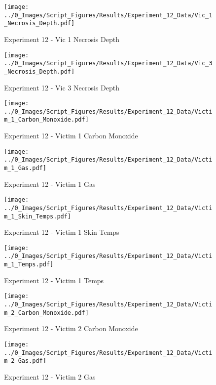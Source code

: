 	\clearpage

	\begin{figure}[H]
		\centering
		\texttt{[image: ../0\_Images/Script\_Figures/Results/Experiment\_12\_Data/Vic\_1\_Necrosis\_Depth.pdf]}
		\caption[]{Experiment 12 - Vic 1 Necrosis Depth}
	\end{figure}
 

	\begin{figure}[H]
		\centering
		\texttt{[image: ../0\_Images/Script\_Figures/Results/Experiment\_12\_Data/Vic\_3\_Necrosis\_Depth.pdf]}
		\caption[]{Experiment 12 - Vic 3 Necrosis Depth}
	\end{figure}
 
	\clearpage

	\begin{figure}[H]
		\centering
		\texttt{[image: ../0\_Images/Script\_Figures/Results/Experiment\_12\_Data/Victim\_1\_Carbon\_Monoxide.pdf]}
		\caption[]{Experiment 12 - Victim 1 Carbon Monoxide}
	\end{figure}
 

	\begin{figure}[H]
		\centering
		\texttt{[image: ../0\_Images/Script\_Figures/Results/Experiment\_12\_Data/Victim\_1\_Gas.pdf]}
		\caption[]{Experiment 12 - Victim 1 Gas}
	\end{figure}
 
	\clearpage

	\begin{figure}[H]
		\centering
		\texttt{[image: ../0\_Images/Script\_Figures/Results/Experiment\_12\_Data/Victim\_1\_Skin\_Temps.pdf]}
		\caption[]{Experiment 12 - Victim 1 Skin Temps}
	\end{figure}
 

	\begin{figure}[H]
		\centering
		\texttt{[image: ../0\_Images/Script\_Figures/Results/Experiment\_12\_Data/Victim\_1\_Temps.pdf]}
		\caption[]{Experiment 12 - Victim 1 Temps}
	\end{figure}
 
	\clearpage

	\begin{figure}[H]
		\centering
		\texttt{[image: ../0\_Images/Script\_Figures/Results/Experiment\_12\_Data/Victim\_2\_Carbon\_Monoxide.pdf]}
		\caption[]{Experiment 12 - Victim 2 Carbon Monoxide}
	\end{figure}
 

	\begin{figure}[H]
		\centering
		\texttt{[image: ../0\_Images/Script\_Figures/Results/Experiment\_12\_Data/Victim\_2\_Gas.pdf]}
		\caption[]{Experiment 12 - Victim 2 Gas}
	\end{figure}
 
